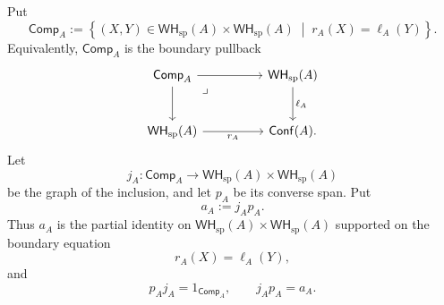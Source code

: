 \documentclass[oneside]{article}
\newcommand{\Conf}{\mathsf{Conf}}
\newcommand{\WH}{\mathsf{WH}}
\theoremstyle{plain}
\theoremstyle{definition}
\theoremstyle{remark}
\begin{document}
Put
\begin{equation}
    \mathsf{Comp}_A
    :=
    \left\{
        (X,Y)\in
        \WH_{\mathrm{sp}}(A)\times\WH_{\mathrm{sp}}(A)
        \;\middle|\;
        r_A(X)=\ell_A(Y)
    \right\}.
    \label{eq:cgqg-ps-cotensor-identification}
\end{equation}
Equivalently, \(\mathsf{Comp}_A\) is the boundary pullback
\begin{equation*}
    \begin{tikzcd}[row sep=large,column sep=huge]
        \mathsf{Comp}_A
            \arrow[r]
            \arrow[d]
            \arrow[dr,phantom,"\lrcorner",very near start]
        &
        \WH_{\mathrm{sp}}(A)
            \arrow[d,"\ell_A"]
        \\
        \WH_{\mathrm{sp}}(A)
            \arrow[r,"r_A"']
        &
        \Conf(A).
    \end{tikzcd}
\end{equation*}
Let
\[
    j_A:
    \mathsf{Comp}_A
    \longrightarrow
    \WH_{\mathrm{sp}}(A)\times\WH_{\mathrm{sp}}(A)
\]
be the graph of the inclusion, and let \(p_A\) be its converse span. Put
\[
    a_A:=j_Ap_A.
\]
Thus \(a_A\) is the partial identity on \(\WH_{\mathrm{sp}}(A)\times\WH_{\mathrm{sp}}(A)\) supported on the boundary equation
\[
    r_A(X)=\ell_A(Y),
\]
and
\[
    p_Aj_A=1_{\mathsf{Comp}_A},
    \qquad
    j_Ap_A=a_A.
\]
\end{document}
